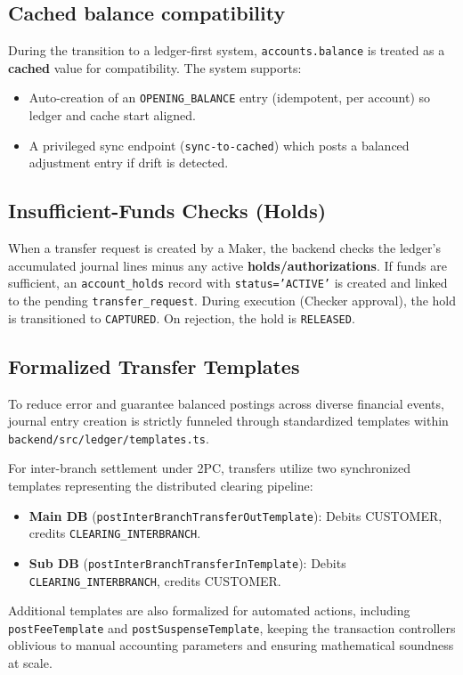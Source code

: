 \subsection{Cached balance compatibility}
During the transition to a ledger-first system, \texttt{accounts.balance} is treated as a \textbf{cached} value for compatibility. The system supports:
\begin{itemize}[nosep]
  \item Auto-creation of an \texttt{OPENING\_BALANCE} entry (idempotent, per account) so ledger and cache start aligned.
  \item A privileged sync endpoint (\texttt{sync-to-cached}) which posts a balanced adjustment entry if drift is detected.
\end{itemize}

\subsection{Insufficient-Funds Checks (Holds)}
When a transfer request is created by a Maker, the backend checks the ledger's accumulated journal lines minus any active \textbf{holds/authorizations}. If funds are sufficient, an \texttt{account\_holds} record with \texttt{status='ACTIVE'} is created and linked to the pending \texttt{transfer\_request}. During execution (Checker approval), the hold is transitioned to \texttt{CAPTURED}. On rejection, the hold is \texttt{RELEASED}.

\subsection{Formalized Transfer Templates}
To reduce error and guarantee balanced postings across diverse financial events, journal entry creation is strictly funneled through standardized templates within \texttt{backend/src/ledger/templates.ts}.

For inter-branch settlement under 2PC, transfers utilize two synchronized templates representing the distributed clearing pipeline:
\begin{itemize}[nosep]
  \item \textbf{Main DB} (\texttt{postInterBranchTransferOutTemplate}): Debits CUSTOMER, credits \texttt{CLEARING\_INTERBRANCH}.
  \item \textbf{Sub DB} (\texttt{postInterBranchTransferInTemplate}): Debits \texttt{CLEARING\_INTERBRANCH}, credits CUSTOMER.
\end{itemize}

Additional templates are also formalized for automated actions, including \texttt{postFeeTemplate} and \texttt{postSuspenseTemplate}, keeping the transaction controllers oblivious to manual accounting parameters and ensuring mathematical soundness at scale.

